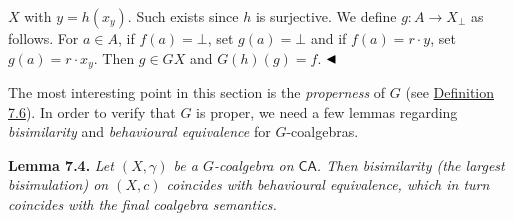 \documentclass[11pt,a4paper]{amsart}
\begin{document}
\hypertarget{html:S7.SS0.SSS0.P0.SPx2.p2.m4}{}\({X}\) with %
\hypertarget{html:S7.SS0.SSS0.P0.SPx2.p2.m5}{}\({y=h(x_{y})}\). Such exists since %
\hypertarget{html:S7.SS0.SSS0.P0.SPx2.p2.m6}{}\({h}\) is surjective. We define %
\hypertarget{html:S7.SS0.SSS0.P0.SPx2.p2.m7}{}\({g\colon A\to X_{\bot}}\) as follows. For %
\hypertarget{html:S7.SS0.SSS0.P0.SPx2.p2.m8}{}\({a\in A}\), if %
\hypertarget{html:S7.SS0.SSS0.P0.SPx2.p2.m9}{}\({f(a)=\bot}\), set %
\hypertarget{html:S7.SS0.SSS0.P0.SPx2.p2.m10}{}\({g(a)=\bot}\) and if %
\hypertarget{html:S7.SS0.SSS0.P0.SPx2.p2.m11}{}\({f(a)=r\cdot y}\), set %
\hypertarget{html:S7.SS0.SSS0.P0.SPx2.p2.m12}{}\({g(a)=r\cdot x_{y}}\). Then %
\hypertarget{html:S7.SS0.SSS0.P0.SPx2.p2.m13}{}\({g\in GX}\) and %
\hypertarget{html:S7.SS0.SSS0.P0.SPx2.p2.m14}{}\({G(h)(g)=f}\). %
\hypertarget{html:S7.SS0.SSS0.P0.SPx2.p2.m15}{}\({\hfill\blacktriangleleft}\)
\par\medskip
\hypertarget{html:S7.SS0.SSS0.P0.SPx2.p3}{} The most interesting point in this section is the \emph{properness} of %
\hypertarget{html:S7.SS0.SSS0.P0.SPx2.p3.m1}{}\({G}\) (see \hyperlink{html:S7.Thmtheorem6}{Definition 7.6}). In order to verify that %
\hypertarget{html:S7.SS0.SSS0.P0.SPx2.p3.m2}{}\({G}\) is proper, we need a few lemmas regarding \emph{bisimilarity} and \emph{behavioural equivalence} for %
\hypertarget{html:S7.SS0.SSS0.P0.SPx2.p3.m3}{}\({G}\)-coalgebras.
\par\medskip
\hypertarget{html:S7.Thmtheorem4}{} \par\noindent\textbf{\textbf{Lemma 7.4}\textbf{.}}\quad  %
\hypertarget{html:S7.Thmtheorem4.p1}{} \emph{Let %
\hypertarget{html:S7.Thmtheorem4.p1.m1}{}\({(X,\gamma)}\) be a %
\hypertarget{html:S7.Thmtheorem4.p1.m2}{}\({G}\)-coalgebra on %
\hypertarget{html:S7.Thmtheorem4.p1.m3}{}\({\mathsf{CA}}\). Then bisimilarity (the largest bisimulation) on %
\hypertarget{html:S7.Thmtheorem4.p1.m4}{}\({(X,c)}\) coincides with behavioural equivalence, which in turn coincides with the final coalgebra semantics.}
\end{document}
